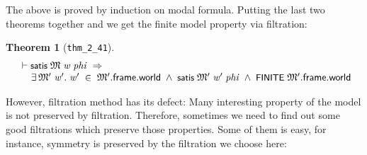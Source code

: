 \documentclass[letterpaper]{article}
\newtheorem{thm}{Theorem}
\renewcommand{\HOLConst}[1]{{\textsf{\upshape\small #1}}}
\newenvironment{holmath}{\begin{displaymath}\begin{array}{l}}{\end{array}\end{displaymath}\ignorespacesafterend}
\begin{document}
The above is proved by induction on modal formula. Putting the last two theorems together and we get the finite model property via filtration:
\begin{thm}[\texttt{thm_2_41}]
\begin{holmath}
  \ensuremath{\HOLTokenTurnstile}\HOLConst{satis}\;\HOLFreeVar{\ensuremath{\mathfrak{M}}}\;\HOLFreeVar{w}\;\HOLFreeVar{phi}\;\HOLSymConst{\HOLTokenImp{}}\\
\;\;\;\;\;\HOLSymConst{\HOLTokenExists{}}\HOLBoundVar{\ensuremath{\mathfrak{M}'}}\;\HOLBoundVar{w\sp{\prime}}.\;\HOLBoundVar{w\sp{\prime}}\;\HOLSymConst{\HOLTokenIn{}}\;\HOLBoundVar{\ensuremath{\mathfrak{M}'}}.\HOLFieldName{frame}.\HOLFieldName{world}\;\HOLSymConst{\HOLTokenConj{}}\;\HOLConst{satis}\;\HOLBoundVar{\ensuremath{\mathfrak{M}'}}\;\HOLBoundVar{w\sp{\prime}}\;\HOLFreeVar{phi}\;\HOLSymConst{\HOLTokenConj{}}\;\HOLConst{FINITE}\;\HOLBoundVar{\ensuremath{\mathfrak{M}'}}.\HOLFieldName{frame}.\HOLFieldName{world}
\end{holmath}
\end{thm}

However, filtration method has its defect: Many interesting property of the model is not preserved by filtration. Therefore, sometimes we need to find out some good filtrations which preserve those properties. Some of them is easy, for instance, symmetry is preserved by the filtration we choose here: %
\end{document}
